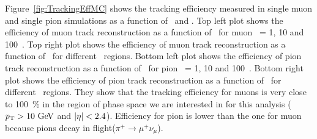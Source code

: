 Figure~\ref{fig:TrackingEffMC} shows the tracking efficiency 
measured in single muon and single pion simulations as a function 
of \pt\ and \Eta. 
Top left plot shows the efficiency of muon track reconstruction as a function of \Eta\
for muon \pt\ = 1, 10 and 100~\GeV. 
Top right plot shows the efficiency of muon track reconstruction as a function of \pt\
for different \Eta\ regions. 
Bottom left plot shows the efficiency of pion track reconstruction as a function of \Eta\
for pion \pt\ = 1, 10 and 100~\GeV. 
Bottom right plot shows the efficiency of pion track reconstruction as a function of \pt\
for different \Eta\ regions. 
They show that the tracking efficiency for muons is very close to 100~\% 
in the region of phase space we are interested in for this analysis
($p_\mathrm{T}>10~\mathrm{Ge\kern -0.1em V}$ and $|\eta|<2.4$). Efficiency for pion is lower than the one for muon 
because pions decay in flight($\pi^+\to\mu^+\nu_\mu$).  

